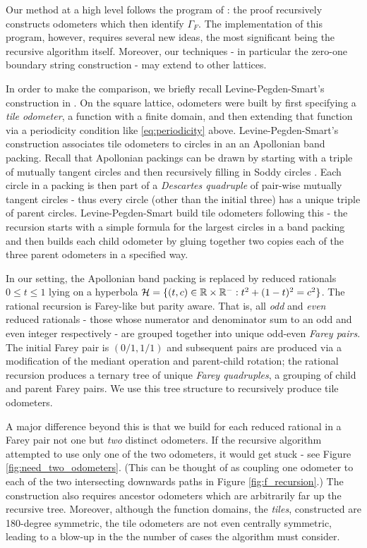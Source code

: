 \documentclass[12pt]{amsart}
\begin{document}
Our method at a high level follows the program of \cite{levine2017apollonian}: 
the proof recursively constructs odometers which then identify $\Gamma_F$. The implementation of this program,
however, requires several new ideas, the most significant being the recursive algorithm itself. Moreover,  
our techniques - in particular the zero-one boundary string construction -  may extend to other lattices. 

In order to make the comparison, we briefly recall Levine-Pegden-Smart's construction in \cite{levine2017apollonian}. 
On the square lattice, odometers were built by first specifying a {\it tile odometer}, a
function with a finite domain, and then extending that function via a periodicity condition like \eqref{eq:periodicity} above. 
Levine-Pegden-Smart's construction associates tile odometers to circles in an an Apollonian band packing. Recall that
Apollonian packings can be drawn by starting with a triple of mutually tangent circles and then recursively filling in Soddy circles \cite{graham2005apollonian}. Each circle in a packing is then part of a {\it Descartes quadruple} 
of pair-wise mutually tangent circles - thus every circle (other than the initial three) has a unique triple 
of parent circles. Levine-Pegden-Smart build tile odometers following this - the recursion starts with a simple formula for the largest circles in a band packing and then builds each child odometer by gluing together two copies each of the three parent odometers in a specified way. 

In our setting, the Apollonian band packing is replaced by reduced rationals $0 \leq t \leq 1$ lying on a hyperbola $\mathcal{H} = \{ (t,c) \in \mathbb{R} \times \mathbb{R}^- : t^2 + (1-t)^2 = c^2\}$. The 
rational recursion is Farey-like but parity aware. That is, all {\it odd} and {\it even} 
reduced rationals - those whose numerator and denominator sum to an odd and even integer respectively - are grouped 
together into unique odd-even {\it Farey pairs}.  The initial Farey pair is $(0/1, 1/1)$ and subsequent pairs are produced via a modification
of the mediant operation and parent-child rotation; the rational recursion produces a ternary tree of unique {\it Farey quadruples},
a grouping of child and parent Farey pairs. We use this tree structure to recursively produce tile odometers. 

A major difference beyond this is that we build for each reduced rational in a Farey pair not one but {\it two} distinct odometers. 
If the recursive algorithm attempted to use only one of the two odometers, it would get stuck -  see Figure \ref{fig:need_two_odometers}.
(This can be thought of as coupling one odometer to each of the two intersecting downwards paths in Figure \ref{fig:f_recursion}.)
The construction also requires ancestor odometers which are arbitrarily far up the recursive tree. 
Moreover, although the function domains, the {\it tiles}, constructed are 180-degree symmetric, 
the tile odometers are not even centrally symmetric, leading to a blow-up in the the number of cases the algorithm must consider. 
\end{document}
